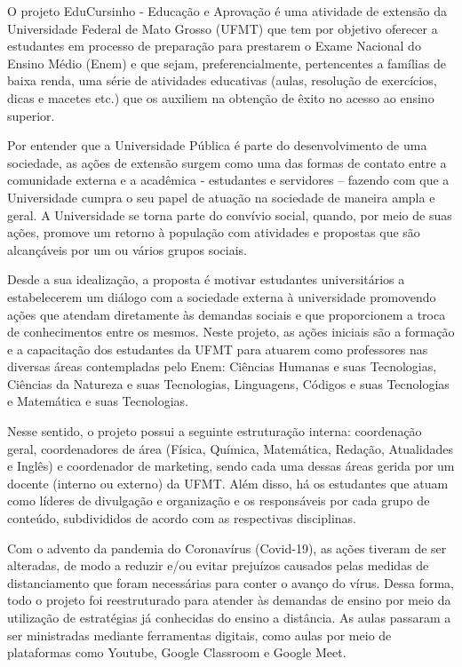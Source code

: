 
\setlength{\parskip}{1mm}
\fontsize{11}{13}
\selectfont
O projeto EduCursinho - Educação e Aprovação é uma atividade de extensão 
da Universidade Federal de Mato Grosso (UFMT) que tem por objetivo 
oferecer a estudantes em processo de preparação para prestarem o Exame 
Nacional do Ensino Médio (Enem) e que sejam, preferencialmente, 
pertencentes a famílias de baixa renda, uma série de atividades educativas 
(aulas, resolução de exercícios, dicas e macetes etc.) que os auxiliem na 
obtenção de êxito no acesso ao ensino superior.

Por entender que a Universidade Pública é parte do desenvolvimento de uma 
sociedade, as ações de extensão surgem como uma das formas de contato 
entre a comunidade externa e a acadêmica - estudantes e servidores – 
fazendo com que a Universidade cumpra o seu papel de atuação na sociedade 
de maneira ampla e geral. A Universidade se torna parte do convívio 
social, quando, por meio de suas ações, promove um retorno à população com 
atividades e propostas que são alcançáveis por um ou vários grupos sociais.

Desde a sua idealização, a proposta é motivar estudantes universitários a 
estabelecerem um diálogo com a sociedade externa à universidade promovendo 
ações que atendam diretamente às demandas sociais e que proporcionem a 
troca de conhecimentos entre os mesmos. Neste projeto, as ações iniciais 
são a formação e a capacitação dos estudantes da UFMT para atuarem como 
professores nas diversas áreas contempladas pelo Enem: Ciências Humanas e 
suas Tecnologias, Ciências da Natureza e suas Tecnologias, Linguagens, 
Códigos e suas Tecnologias e Matemática e suas Tecnologias.

Nesse sentido, o projeto possui a seguinte estruturação interna: 
coordenação geral, coordenadores de área (Física, Química, Matemática, 
Redação, Atualidades e Inglês) e coordenador de marketing, sendo cada uma 
dessas áreas gerida por um docente (interno ou externo) da UFMT. Além 
disso, há os estudantes que atuam como líderes de divulgação e organização 
e os responsáveis por cada grupo de conteúdo, subdivididos de acordo com 
as respectivas disciplinas.

Com o advento da pandemia do Coronavírus (Covid-19), as ações tiveram de 
ser alteradas, de modo a reduzir e/ou evitar prejuízos causados pelas 
medidas de distanciamento que foram necessárias para conter o avanço do 
vírus. Dessa forma, todo o projeto foi reestruturado para atender às 
demandas de ensino por meio da utilização de estratégias já conhecidas do 
ensino a distância. As aulas passaram a ser ministradas mediante 
ferramentas digitais, como aulas por meio de plataformas como Youtube, 
Google Classroom e Google Meet.

